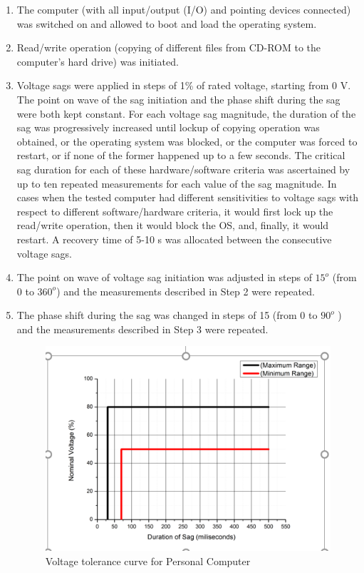 \documentclass[17pt, a4paper]{extreport}
\begin{document}
\begin{enumerate}
    \item The computer (with all input/output (I/O) and pointing devices connected) was switched on and allowed to boot and load the operating system.
    
    \item Read/write operation (copying of different files from CD-ROM to the computer’s hard drive) was initiated.
    
    \item Voltage sags were applied in steps of 1\% of rated voltage, starting from 0 V. The point on wave of the sag initiation and the phase shift during the sag were both kept constant. For each voltage sag magnitude, the duration of the sag was progressively increased until lockup of copying operation was obtained, or the operating system was blocked, or the computer was forced to restart, or if none of the former happened up to a few seconds. The critical sag duration for each of these hardware/software criteria was ascertained by up to ten repeated measurements for each value of the sag magnitude. In cases when the tested computer had different sensitivities to voltage sags with respect to different software/hardware criteria, it would first lock up the read/write operation, then it would block the OS, and, finally, it would restart. A recovery time of 5-10 s was allocated between the consecutive voltage sags.
    
    \item The point on wave of voltage sag initiation was adjusted in steps of $15^{o}$ (from 0 to $360^{o}$) and the  measurements described in Step 2 were repeated.
 \item  The phase shift during the sag was changed in steps of 15 (from 0 to $90^{o}$ ) and the measurements described in Step 3 were repeated.
 
 \begin{figure}
     \centering
     \includegraphics[width=\textwidth]{pc.PNG}
     \caption{ Voltage tolerance curve for Personal Computer}
     \label{fig:PC_characteristics}
 \end{figure}
 

\end{enumerate}
\end{document}
